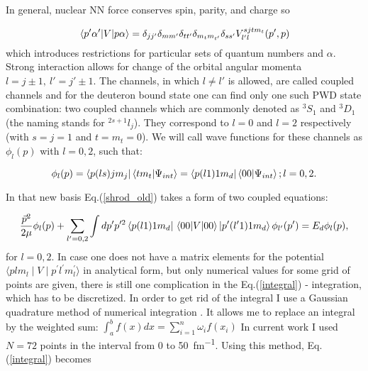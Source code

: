     In general, nuclear NN force conserves spin, parity, and charge so

    \begin{equation}
        \matrixel*{p^\prime\alpha^\prime}{V}{p\alpha} = \delta_{jj'}\delta_{mm'}\delta_{tt'}\delta_{m_tm_{t'}}
        \delta_{ss'}V^{sjtm_t}_{l'l}(p',p)
        \label{conservation}
    \end{equation}
    which introduces restrictions for particular sets of quantum numbers and $\alpha$.
    Strong interaction allows for change of the orbital angular momenta $l = j \pm 1,~l'=j'\pm1$.
    The channels, in which  $l \neq l'$ is allowed,
    are called coupled channels and for the deuteron bound state 
    one can find only one such PWD state combination:
    two coupled channels 
    which are commonly denoted as $^3S_1$ and $^3D_1$ (the naming stands for $^{2s+1}l_j$). They correspond 
    to $l=0$ and $l=2$ respectively (with $s = j = 1$ and $t = m_t = 0$). 
    We will call wave functions for these channels as $\phi_l(p)$ with $l=0,2$, such that:

    
    \begin{equation}
        \phi_l(p) = \bra{p (ls) j m_j}\braket{t m_t}{\Psi_{int}} = \bra{p(l1)1m_d} \braket{00}{\Psi_{int}}; l=0,2.
        \label{deut_waves}
    \end{equation}

    In that new basis Eq.(\ref{shrod_old}) takes a form of two coupled equations:

    \begin{equation}
        \frac{\vec{p}^2}{2\mu} \phi_l(p) +
        \sum_{l^\prime =0,2} \int d p^\prime p^{\prime 2} 
        \bra{p(l1)1m_d} \matrixel{00}{V}{00} \ket{p^\prime(l^\prime1)1m_d}
        \phi_{l^\prime}(p^\prime) = 
        E_d \phi_l(p),
        \label{integral}
    \end{equation}
    for $l=0,2$. In case one does not have a matrix elements for the potential 
    $\langle plm_l \mid V \mid p^\prime l^\prime m_l^\prime  \rangle$ in analytical form,
    but only numerical values for some grid of points are given, 
    there is still one complication in the Eq.(\ref{integral}) - integration, which has to be discretized.
    In order to get rid of the integral I use a Gaussian quadrature 
    method of numerical integration \cite{jacobi1826ueber}.
    It allows me to replace an integral by the weighted sum:
        $\int_a^b f(x)dx = \sum_{i=1}^n \omega_i f(x_i)$
    In current work I used $N=72$ points in the interval from $0$ to \SI{50}{fm^{-1}}. 
    Using this method, Eq.(\ref{integral}) becomes  

